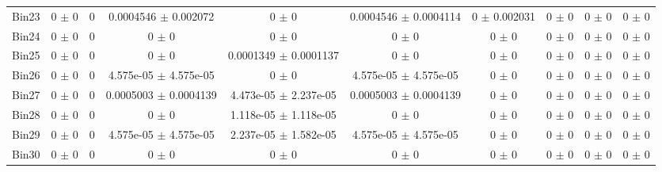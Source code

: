 \begin{tabular}{@{\extracolsep{4pt}}lccccccccc@{}}
     Bin23 & 0 $\pm$ 0 & 0 & 0.0004546 $\pm$ 0.002072 & 0 $\pm$ 0 & 0.0004546 $\pm$ 0.0004114 & 0 $\pm$ 0.002031 & 0 $\pm$ 0 & 0 $\pm$ 0 & 0 $\pm$ 0 \\ 
     Bin24 & 0 $\pm$ 0 & 0 & 0 $\pm$ 0 & 0 $\pm$ 0 & 0 $\pm$ 0 & 0 $\pm$ 0 & 0 $\pm$ 0 & 0 $\pm$ 0 & 0 $\pm$ 0 \\ 
     Bin25 & 0 $\pm$ 0 & 0 & 0 $\pm$ 0 & 0.0001349 $\pm$ 0.0001137 & 0 $\pm$ 0 & 0 $\pm$ 0 & 0 $\pm$ 0 & 0 $\pm$ 0 & 0 $\pm$ 0 \\ 
     Bin26 & 0 $\pm$ 0 & 0 & 4.575e-05 $\pm$ 4.575e-05 & 0 $\pm$ 0 & 4.575e-05 $\pm$ 4.575e-05 & 0 $\pm$ 0 & 0 $\pm$ 0 & 0 $\pm$ 0 & 0 $\pm$ 0 \\ 
     Bin27 & 0 $\pm$ 0 & 0 & 0.0005003 $\pm$ 0.0004139 & 4.473e-05 $\pm$ 2.237e-05 & 0.0005003 $\pm$ 0.0004139 & 0 $\pm$ 0 & 0 $\pm$ 0 & 0 $\pm$ 0 & 0 $\pm$ 0 \\ 
     Bin28 & 0 $\pm$ 0 & 0 & 0 $\pm$ 0 & 1.118e-05 $\pm$ 1.118e-05 & 0 $\pm$ 0 & 0 $\pm$ 0 & 0 $\pm$ 0 & 0 $\pm$ 0 & 0 $\pm$ 0 \\ 
     Bin29 & 0 $\pm$ 0 & 0 & 4.575e-05 $\pm$ 4.575e-05 & 2.237e-05 $\pm$ 1.582e-05 & 4.575e-05 $\pm$ 4.575e-05 & 0 $\pm$ 0 & 0 $\pm$ 0 & 0 $\pm$ 0 & 0 $\pm$ 0 \\ 
     Bin30 & 0 $\pm$ 0 & 0 & 0 $\pm$ 0 & 0 $\pm$ 0 & 0 $\pm$ 0 & 0 $\pm$ 0 & 0 $\pm$ 0 & 0 $\pm$ 0 & 0 $\pm$ 0 \\ 
\hline\hline
  \end{tabular}
